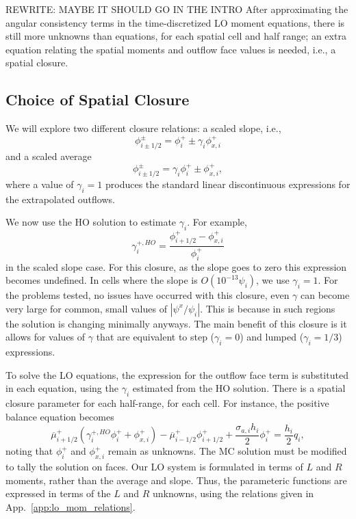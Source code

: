 REWRITE: MAYBE IT SHOULD GO IN THE INTRO
After approximating the angular consistency terms in the time-discretized LO moment equations, 
there is still more unknowns than equations, for each spatial
cell and half range; an extra equation relating the spatial moments and outflow face values is
needed, i.e., a spatial closure.

\subsection{Choice of Spatial Closure}
\label{sec:spat_clos_options}

We will
explore two different closure relations: a scaled slope, i.e.,
\begin{equation}
    \phi_{i\pm1/2}^\pm = \phi_i^+ \pm \gamma_i \phi_{x,i}^+
\end{equation}
and a scaled average
\begin{equation}
    \phi_{i\pm1/2}^\pm = \gamma_i \phi_i^+ \pm \phi_{x,i}^+,
\end{equation}
where a value of $\gamma_i = 1$ produces the standard linear discontinuous expressions for
the extrapolated outflows.  

We now use the HO solution to estimate $\gamma_i$.  For example, 
\begin{equation}
    \gamma_i^{+,HO} = \frac{\phi_{i+1/2}^+ - \phi_{x,i}^+}{\phi_i^+}
\end{equation}
in the scaled slope case.  For this closure, as the slope goes to zero this expression
becomes undefined.  In cells where the slope is $O(10^{-13} \psi_i)$, we use $\gamma_i=1$.
For the problems tested, no issues have occurred with this closure, even $\gamma$
can become very large for common, small values of $|\psi^x/\psi_i|$.  This is because in
such regions the solution is changing minimally anyways. 
The main benefit of this closure is it allows for values of $\gamma$ that are
equivalent to step ($\gamma_i=0$) and lumped ($\gamma_i=1/3$) expressions.

To solve the LO equations, the expression for the outflow face term is substituted in each equation, using the
$\gamma_i$ estimated from the HO solution. There is a spatial closure parameter for each
half-range, for each cell.
For instance, the positive balance equation becomes
\begin{equation}
    \overline\mu^+_{i+1/2}\left( \gamma_i^{+,HO} \phi_i^+ + \phi_{x,i}^+ \right) - \overline\mu^+_{i-1/2}\phi_{i+1/2}^+ +
    \frac{\sigma_{a,i}h_i}{2} \phi_i^+ = \frac{h_i}{2} q_i,
    \label{eqn:clsd_posbal}
\end{equation}
noting that $\phi_i^+$ and $\phi_{x,i}^+$ remain as unknowns. The MC solution must be modified
to tally the solution on faces. Our LO system is formulated in terms of $L$ and $R$ moments, rather than the average and
slope.  Thus, the parameteric functions are expressed in terms of the $L$ and $R$
unknowns, using the relations given in App.~\ref{app:lo_mom_relations}.  


